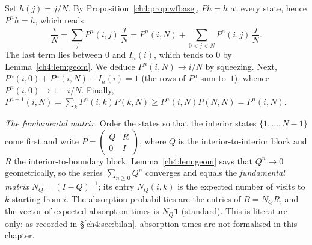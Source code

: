 \begin{humanproof}
Set $h(j)=j/N$. By Proposition~\ref{ch4:prop:wfbase}, $Ph=h$ at every state, hence $P^nh=h$, which reads
\[
\frac iN=\sum_jP^n(i,j)\,\frac jN=P^n(i,N)+\sum_{0<j<N}P^n(i,j)\,\frac jN .
\]
The last term lies between $0$ and $I_n(i)$, which tends to $0$ by Lemma~\ref{ch4:lem:geom}. We deduce
$P^n(i,N)\to i/N$ by squeezing. Next, $P^n(i,0)+P^n(i,N)+I_n(i)=1$ (the rows of $P^n$ sum to~$1$),
whence $P^n(i,0)\to1-i/N$. Finally, $P^{n+1}(i,N)=\sum_kP^n(i,k)P(k,N)\ge P^n(i,N)P(N,N)=P^n(i,N)$.
\end{humanproof}

\begin{uniremark}\tierL{} \emph{The fundamental matrix.} Order the states so that the interior states
$\{1,\dots,N-1\}$ come first and write $P=\begin{pmatrix}Q&R\\0&I\end{pmatrix}$, where $Q$ is the interior-to-interior
block and $R$ the interior-to-boundary block. Lemma~\ref{ch4:lem:geom} says that $Q^n\to0$ geometrically, so
the series $\sum_{n\ge0}Q^n$ converges and equals the \emph{fundamental matrix} $N_Q=(I-Q)^{-1}$; its entry
$N_Q(i,k)$ is the expected number of visits to $k$ starting from $i$. The absorption probabilities are the entries
of $B=N_QR$, and the vector of expected absorption times is $N_Q\mathbf 1$ \cite{app:norris} (standard). This is
literature only: as recorded in §\ref{ch4:sec:bilan}, absorption times are not formalised in this chapter.
\end{uniremark}

